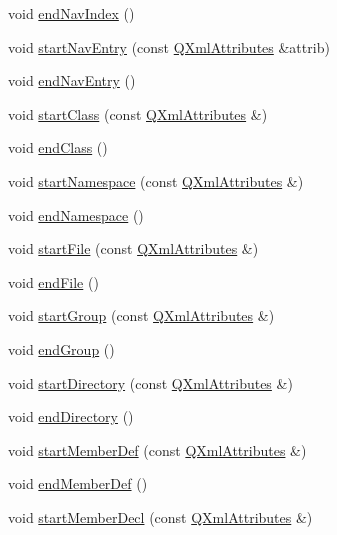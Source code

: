 \begin{DoxyCompactItemize}
void \hyperlink{class_layout_parser_ac23ebe1f687d00e2de1afe54e9774d6e}{end\+Nav\+Index} ()
\item 
void \hyperlink{class_layout_parser_ab1c6a6e8435dfac22c988ca0f1f434c3}{start\+Nav\+Entry} (const \hyperlink{class_q_xml_attributes}{Q\+Xml\+Attributes} \&attrib)
\item 
void \hyperlink{class_layout_parser_aeef097868148b046c02b7b2ecdd42e59}{end\+Nav\+Entry} ()
\item 
void \hyperlink{class_layout_parser_a43f4c8089b8a9da04be6cbd17672c69a}{start\+Class} (const \hyperlink{class_q_xml_attributes}{Q\+Xml\+Attributes} \&)
\item 
void \hyperlink{class_layout_parser_aedfb21bc901f880aa359f2c23f82492a}{end\+Class} ()
\item 
void \hyperlink{class_layout_parser_a6fddf2358d18a9caefde0e7e93cdcbd0}{start\+Namespace} (const \hyperlink{class_q_xml_attributes}{Q\+Xml\+Attributes} \&)
\item 
void \hyperlink{class_layout_parser_aadce9f277dc348593d137d06c79ede26}{end\+Namespace} ()
\item 
void \hyperlink{class_layout_parser_ac6a715c3de3c7eb65dded27f7e667489}{start\+File} (const \hyperlink{class_q_xml_attributes}{Q\+Xml\+Attributes} \&)
\item 
void \hyperlink{class_layout_parser_a243a2f6da8f80d564283f569f4d3dad7}{end\+File} ()
\item 
void \hyperlink{class_layout_parser_a968de3bc9328f0f0e9a93406001fd293}{start\+Group} (const \hyperlink{class_q_xml_attributes}{Q\+Xml\+Attributes} \&)
\item 
void \hyperlink{class_layout_parser_a07e465e3a3b8f544e0c5857f99200ffa}{end\+Group} ()
\item 
void \hyperlink{class_layout_parser_abc39b9f2b8f2745fbb9aa66e3cfa0a82}{start\+Directory} (const \hyperlink{class_q_xml_attributes}{Q\+Xml\+Attributes} \&)
\item 
void \hyperlink{class_layout_parser_aedf31ed1122667f92f01ee56e9c62a2e}{end\+Directory} ()
\item 
void \hyperlink{class_layout_parser_a3f7a37e5a0c26d8fd9ee8e305f574a98}{start\+Member\+Def} (const \hyperlink{class_q_xml_attributes}{Q\+Xml\+Attributes} \&)
\item 
void \hyperlink{class_layout_parser_a9962ccd9bdd19597ef89c7b70d4d9b71}{end\+Member\+Def} ()
\item 
void \hyperlink{class_layout_parser_adbb62efccf1bc11e82082034fa0ef6cb}{start\+Member\+Decl} (const \hyperlink{class_q_xml_attributes}{Q\+Xml\+Attributes} \&)

\end{DoxyCompactItemize}

